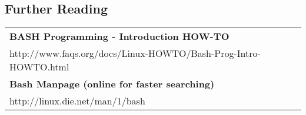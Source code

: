 \begin{multicols*}{3}
\section{Further Reading}

\begin{tabularx}{0.33\textwidth}{X}
\textbf{BASH Programming - Introduction HOW-TO}\\
http://www.faqs.org/docs/Linux-HOWTO/Bash-Prog-Intro-HOWTO.html
\\
\textbf{Bash Manpage (online for faster searching)}\\
http://linux.die.net/man/1/bash
\end{tabularx}

\end{multicols*}


